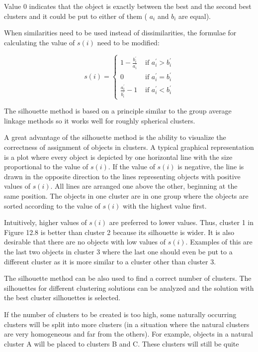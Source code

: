 \documentclass[11pt,openany,executivepaper]{book}
\begin{document}
Value 0 indicates that the object is exactly between the best and the second best clusters and it could be put to either of them ( $a_{i}$ and $b_{i}$ are equal).

When similarities need to be used instead of dissimilarities, the formulae for calculating the value of $s(i)$ need to be modified:

\[
s(i)= \begin{cases}1-\frac{b_{i}^{\prime}}{a_{i}^{\prime}} & \text { if } a_{i}^{\prime}>b_{i}^{\prime}  \tag{12.56}\\ 0 & \text { if } a_{i}^{\prime}=b_{i}^{\prime} \\ \frac{a_{i}^{\prime}}{b_{i}^{\prime}}-1 & \text { if } a_{i}^{\prime}<b_{i}^{\prime}\end{cases}
\]

The silhouette method is based on a principle similar to the group average linkage methods so it works well for roughly spherical clusters.

A great advantage of the silhouette method is the ability to visualize the correctness of assignment of objects in clusters. A typical graphical representation is a plot where every object is depicted by one horizontal line with the size proportional to the value of $s(i)$. If the value of $s(i)$ is negative, the line is drawn in the opposite direction to the lines representing objects with positive values of $s(i)$. All lines are arranged one above the other, beginning at the same position. The objects in one cluster are in one group where the objects are sorted according to the value of $s(i)$ with the highest value first.

Intuitively, higher values of $s(i)$ are preferred to lower values. Thus, cluster 1 in Figure 12.8 is better than cluster 2 because its silhouette is wider. It is also desirable that there are no objects with low values of $s(i)$. Examples of this are the last two objects in cluster 3 where the last one should even be put to a different cluster as it is more similar to a cluster other than cluster 3.

The silhouette method can be also used to find a correct number of clusters. The silhouettes for different clustering solutions can be analyzed and the solution with the best cluster silhouettes is selected.

If the number of clusters to be created is too high, some naturally occurring clusters will be split into more clusters (in a situation where the natural clusters are very homogeneous and far from the others). For example, objects in a natural cluster A will be placed to clusters B and C. These clusters will still be quite
\end{document}
